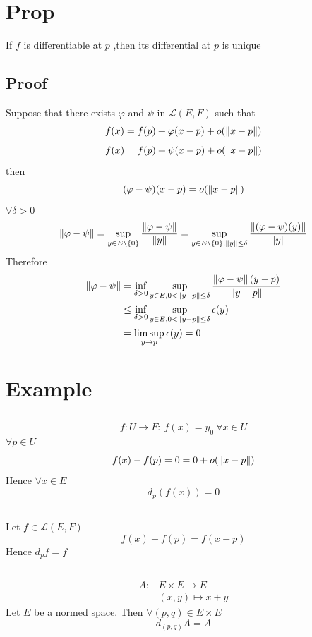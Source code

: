 \documentclass{book}
\begin{document}
\section{Prop} If $f$ is differentiable at $p$ ,then its differential at $p$ is unique
\subsection*{Proof}
Suppose that there exists $\varphi$ and $\psi$ in $\mathscr{L}(E,F)$ such that 
$$f(x)=f(p)+\varphi(x-p)+o(\left\lVert x-p \right\rVert)$$
$$f(x)=f(p)+\psi(x-p)+o(\left\lVert x-p \right\rVert)$$
then $$(\varphi-\psi)(x-p)=o(\left\lVert x-p \right\rVert)$$
$\forall \delta>0$
$$\begin{aligned}
    \left\lVert \varphi-\psi \right\rVert= \sup\limits_{y\in E\setminus\{0\}}\frac{\left\lVert \varphi-\psi \right\rVert}{\left\lVert y \right\rVert}=\sup\limits_{y\in E\setminus\{0\},\left\lVert y \right\rVert\leq\delta}\frac{\left\lVert (\varphi-\psi)(y) \right\rVert}{\left\lVert y \right\rVert}
\end{aligned}$$
Therefore $$
\begin{aligned}
    \left\lVert \varphi-\psi \right\rVert &=\inf\limits_{\delta>0}\sup\limits_{y\in E,0<\left\lVert y-p \right\rVert\leq\delta}\frac{\left\lVert \varphi-\psi \right\rVert(y-p)}{\left\lVert y-p \right\rVert}\\
    &\leq\inf\limits_{\delta>0}\sup\limits_{y\in E,0<\left\lVert y-p \right\rVert\leq\delta}\epsilon(y)\\
    &=\limsup\limits_{y\rightarrow p} \epsilon(y)=0
\end{aligned}$$
\section{Example}
\subsection{}
$$f:U\rightarrow F:\ f(x)=y_0\ \forall x\in U$$
$\forall p\in U$
$$f(x)-f(p)=0=0+o(\left\lVert x-p \right\rVert)$$
Hence $\forall x\in E$
$$d_p(f(x))=0$$
\subsection{}
Let $f\in \mathscr{L}(E,F)$
$$f(x)-f(p)=f(x-p)$$
Hence $d_pf=f$
\subsection{}
$$\begin{aligned}
    A:& E\times E\rightarrow E\\
    &(x,y)\mapsto x+y
\end{aligned}$$
Let $E$ be a normed space.
Then $\forall (p,q)\in E\times E$$$d_{(p,q)}A=A$$
\end{document}
